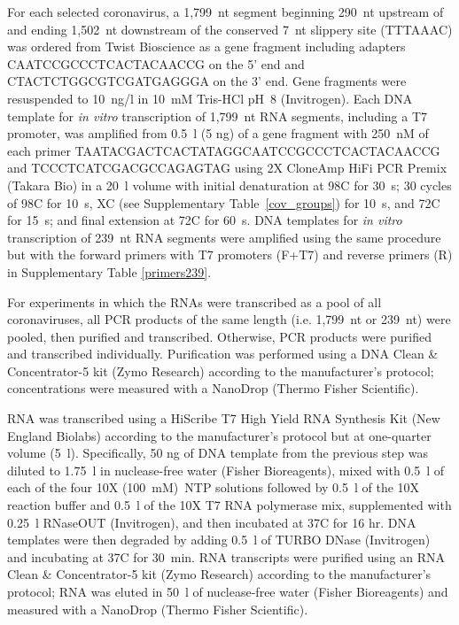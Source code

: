 \documentclass[main.tex]{subfiles}
\begin{document}
For each selected coronavirus, a 1,799~nt segment beginning 290~nt upstream of and ending 1,502~nt downstream of the conserved 7~nt slippery site (TTTAAAC) was ordered from Twist Bioscience as a gene fragment including adapters CAATCCGCCCTCACTACAACCG on the 5' end and CTACTCTGGCGTCGATGAGGGA on the 3' end.
Gene fragments were resuspended to 10~ng/\textmu l in 10~mM Tris-HCl pH~8 (Invitrogen).
Each DNA template for \textit{in vitro} transcription of 1,799~nt RNA segments, including a T7 promoter, was amplified from 0.5~\textmu l (5 ng) of a gene fragment with 250~nM of each primer TAATACGACTCACTATAGGCAATCCGCCCTCACTACAACCG and TCCCTCATCGACGCCAGAGTAG using 2X CloneAmp HiFi PCR Premix (Takara Bio) in a 20~\textmu l volume with initial denaturation at 98\textdegree C for 30~s; 30 cycles of 98\textdegree C for 10~s, X\textdegree C (see Supplementary Table~\ref{cov_groups}) for 10~s, and 72\textdegree C for 15~s; and final extension at 72\textdegree C for 60~s.
DNA templates for \textit{in vitro} transcription of 239~nt RNA segments were amplified using the same procedure but with the forward primers with T7 promoters (F+T7) and reverse primers (R) in Supplementary Table \ref{primers239}.

For experiments in which the RNAs were transcribed as a pool of all coronaviruses, all PCR products of the same length (i.e. 1,799~nt or 239~nt) were pooled, then purified and transcribed.
Otherwise, PCR products were purified and transcribed individually.
Purification was performed using a DNA Clean \& Concentrator-5 kit (Zymo Research) according to the manufacturer's protocol; concentrations were measured with a NanoDrop (Thermo Fisher Scientific).

RNA was transcribed using a HiScribe T7 High Yield RNA Synthesis Kit (New England Biolabs) according to the manufacturer's protocol but at one-quarter volume (5~\textmu l).
Specifically, 50 ng of DNA template from the previous step was diluted to 1.75~\textmu l in nuclease-free water (Fisher Bioreagents), mixed with 0.5~\textmu l of each of the four 10X (100~mM)~NTP solutions followed by 0.5~\textmu l of the 10X reaction buffer and 0.5~\textmu l of the 10X T7 RNA polymerase mix, supplemented with 0.25~\textmu l RNaseOUT (Invitrogen), and then incubated at 37\textdegree C for 16 hr.
DNA templates were then degraded by adding 0.5~\textmu l of TURBO DNase (Invitrogen) and incubating at 37\textdegree C for 30~min.
RNA transcripts were purified using an RNA Clean \& Concentrator-5 kit (Zymo Research) according to the manufacturer's protocol; RNA was eluted in 50~\textmu l of nuclease-free water (Fisher Bioreagents) and measured with a NanoDrop (Thermo Fisher Scientific).
\end{document}
